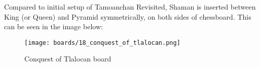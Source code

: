 Compared to initial setup of Tamoanchan Revisited, Shaman is inserted between
King (or Queen) and Pyramid symmetrically, on both sides of chessboard. This
can be seen in the image below:

\noindent
\begin{figure}[h]
\texttt{[image: boards/18\_conquest\_of\_tlalocan.png]}
\caption{Conquest of Tlalocan board}
\label{fig:18_conquest_of_tlalocan}
\end{figure}

\clearpage %
